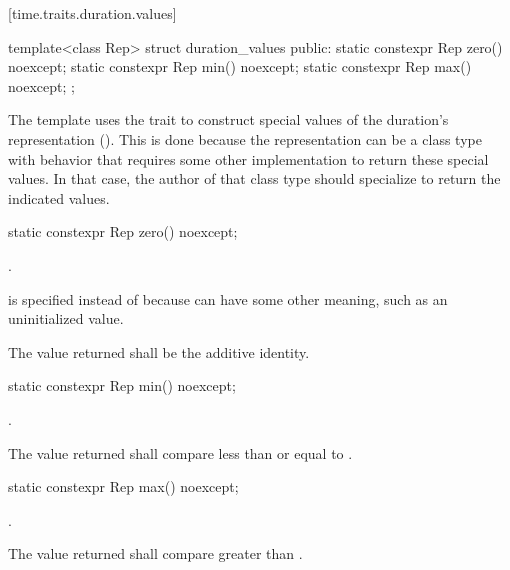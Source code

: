 [time.traits.duration.values]{}

%
\begin{itemdecl}
template<class Rep>
struct duration_values {
public:
  static constexpr Rep zero() noexcept;
  static constexpr Rep min() noexcept;
  static constexpr Rep max() noexcept;
};
\end{itemdecl}

\pnum
The  template uses the  trait to
construct special values of the duration's representation (). This is
done because the representation can be a class type with behavior that
requires some other implementation to return these special values. In that case,
the author of that class type should specialize  to
return the indicated values.

%
\begin{itemdecl}
static constexpr Rep zero() noexcept;
\end{itemdecl}

\begin{itemdescr}
\pnum
\returns
{}.
\begin{note}
 is specified instead of
 because  can have some other meaning, such as an
uninitialized value.
\end{note}

\pnum
\remarks
The value returned shall be the additive identity.
\end{itemdescr}

%
\begin{itemdecl}
static constexpr Rep min() noexcept;
\end{itemdecl}

\begin{itemdescr}
\pnum
\returns
{}.

\pnum
\remarks
The value returned shall compare less than or equal to .
\end{itemdescr}

%
\begin{itemdecl}
static constexpr Rep max() noexcept;
\end{itemdecl}

\begin{itemdescr}
\pnum
\returns
{}.

\pnum
\remarks
The value returned shall compare greater than .
\end{itemdescr}

